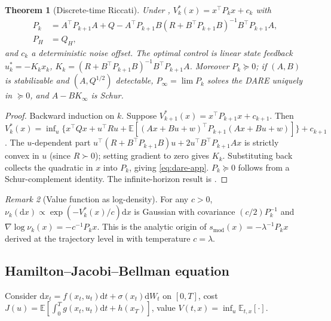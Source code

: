 \documentclass[11pt,letterpaper]{article}
\theoremstyle{plain}
\newtheorem{theorem}{Theorem}[section]
\theoremstyle{definition}
\theoremstyle{remark}
\newtheorem{remark}[theorem]{Remark}
\newcommand{\E}{\mathbb{E}}
\newcommand{\dd}{\mathrm{d}}
\newcommand{\grad}{\nabla}
\newcommand{\smodel}{s_{\mathrm{mod}}}
\begin{document}
\begin{theorem}[Discrete-time Riccati]\label{thm:lqr-app}
Under , $V_k^*(x)=x^\top P_k x+c_k$ with
\begin{align}
  P_k &= A^\top P_{k+1}A+Q-A^\top P_{k+1}B(R+B^\top P_{k+1}B)^{-1}B^\top P_{k+1}A,
  \label{eq:dare-app}\\
  P_H &= Q_H,
\end{align}
and $c_k$ a deterministic noise offset. The optimal control is linear
state feedback $u_k^*=-K_k x_k$, $K_k=(R+B^\top P_{k+1}B)^{-1}B^\top P_{k+1}A$.
Moreover $P_k\succeq 0$; if $(A,B)$ is stabilizable and $(A,Q^{1/2})$
detectable, $P_\infty=\lim P_k$ solves the DARE uniquely in $\succeq 0$, and
$A-BK_\infty$ is Schur.
\end{theorem}
\begin{proof}
Backward induction on $k$. Suppose $V_{k+1}^*(x)=x^\top P_{k+1}x+c_{k+1}$.
Then
$V_k^*(x)=\inf_u\{x^\top Q x+u^\top R u+\E[(Ax+Bu+w)^\top P_{k+1}(Ax+Bu+w)]\}+c_{k+1}$.
The $u$-dependent part $u^\top(R+B^\top P_{k+1}B)u+2u^\top B^\top P_{k+1}Ax$
is strictly convex in $u$ (since $R\succ 0$); setting gradient to zero gives
$K_k$. Substituting back collects the quadratic in $x$ into $P_k$, giving
\eqref{eq:dare-app}. $P_k\succeq 0$ follows from a Schur-complement identity.
The infinite-horizon result is \citep[Ch.~3]{bertsekas2012dp}.
\end{proof}

\begin{remark}[Value function as log-density]\label{rem:logdensity-app}
For any $c>0$, $\nu_k(\dd x)\propto\exp(-V_k^*(x)/c)\dd x$ is Gaussian with
covariance $(c/2)P_k^{-1}$ and
$\grad\log\nu_k(x)=-c^{-1}P_k x$. This is the analytic origin of
$\smodel(x)=-\lambda^{-1}P_k x$ derived at the trajectory level in
 with temperature $c=\lambda$.
\end{remark}

\subsection{Hamilton--Jacobi--Bellman equation}

Consider $\dd x_t=f(x_t,u_t)\dd t+\sigma(x_t)\dd W_t$ on $[0,T]$, cost
$J(u)=\E[\int_0^T g(x_t,u_t)\dd t+h(x_T)]$, value
$V(t,x)=\inf_u\E_{t,x}[\cdot]$.
\end{document}
